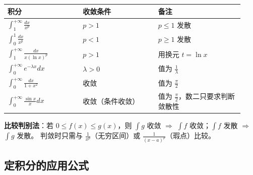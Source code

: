 \documentclass[11pt,openany,UTF8]{ctexbook}
\begin{document}
\begingroup\small\setlength{\tabcolsep}{4.0pt}
\begin{longtable}{@{}L{0.2954\linewidth}L{0.2954\linewidth}L{0.3376\linewidth}@{}}
\toprule
\textbf{积分} & \textbf{收敛条件} & \textbf{备注} \\
\midrule
\endhead
$\int_1^{+\infty}\frac{dx}{x^p}$ & $p>1$ & $p\le1$ 发散 \\
$\int_0^{1}\frac{dx}{x^p}$ & $p<1$ & $p\ge1$ 发散 \\
$\int_1^{+\infty}\frac{dx}{x(\ln x)^p}$ & $p>1$ & 用换元 $t=\ln x$ \\
$\int_0^{+\infty}e^{-\lambda x}dx$ & $\lambda>0$ & 值为 $\frac1\lambda$ \\
$\int_0^{+\infty}\frac{dx}{1+x^2}$ & 收敛 & 值为 $\frac{\pi}{2}$ \\
$\int_0^{+\infty}\frac{\sin x}{x}dx$ & 收敛（条件收敛） & 值为 $\frac{\pi}{2}$，数二只要求判断敛散性 \\
\bottomrule
\end{longtable}
\endgroup

\textbf{比较判别法}：若 $0\le f(x)\le g(x)$，则 $\int g$ 收敛 $\Rightarrow$ $\int f$ 收敛；$\int f$ 发散 $\Rightarrow$ $\int g$ 发散。 判敛时只需与 $\frac{1}{x^p}$（无穷区间）或 $\frac{1}{(x-a)^p}$（瑕点）比较。

\subsection{定积分的应用公式}
\end{document}
